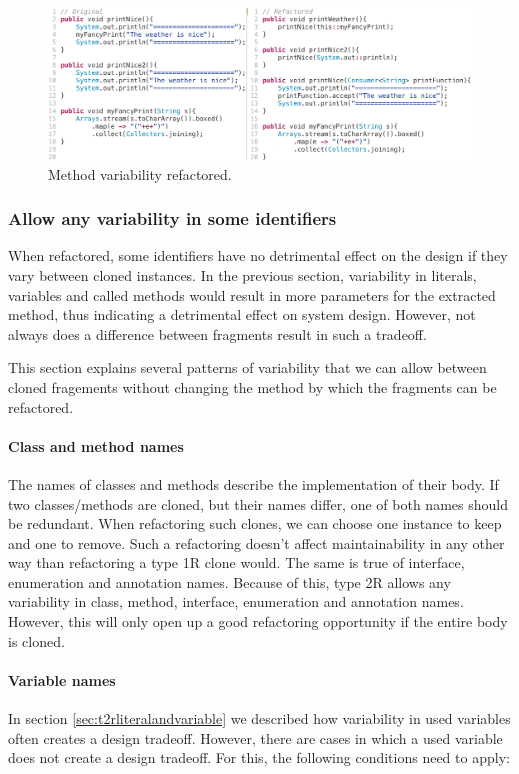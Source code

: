 \begin{figure}[H]
  \centering
  \includegraphics[width=1\columnwidth]{img/type2method}
  \caption{Method variability refactored.}
  \label{fig:type2method}
\end{figure}

\subsubsection{Allow any variability in some identifiers}
When refactored, some identifiers have no detrimental effect on the design if they vary between cloned instances. In the previous section, variability in literals, variables and called methods would result in more parameters for the extracted method, thus indicating a detrimental effect on system design. However, not always does a difference between fragments result in such a tradeoff.

This section explains several patterns of variability that we can allow between cloned fragements without changing the method by which the fragments can be refactored.

\paragraph{Class and method names}
The names of classes and methods describe the implementation of their body. If two classes/methods are cloned, but their names differ, one of both names should be redundant. When refactoring such clones, we can choose one instance to keep and one to remove. Such a refactoring doesn't affect maintainability in any other way than refactoring a type 1R clone would. The same is true of interface, enumeration and annotation names. Because of this, type 2R allows any variability in class, method, interface, enumeration and annotation names. However, this will only open up a good refactoring opportunity if the entire body is cloned.

\paragraph{Variable names}
In section \ref{sec:t2rliteralandvariable} we described how variability in used variables often creates a design tradeoff. However, there are cases in which a used variable does not create a design tradeoff. For this, the following conditions need to apply:

